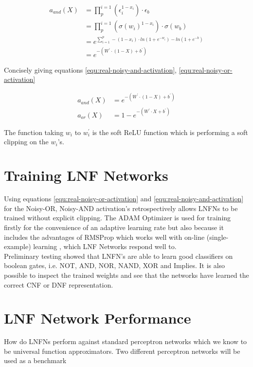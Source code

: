 \begin{align*}
a_{and}(X) &= \prod_{p}^{i=1} (\epsilon_i^{1 - x_i}) \cdot \epsilon_b\\
&= \prod_{p}^{i=1} (\sigma(w_i)^{1 - x_i}) \cdot \sigma(w_b)\\
&= e^{\sum^p_{i=1} -(1 - x_i) \cdot ln(1 + e^{-w_i}) - ln(1 + e^{-b})} \\
&= e^{-(W^{'} \cdot (1 - X) + b^{'})}
\end{align*}

Concisely giving equations \ref{equ:real-noisy-and-activation}, \ref{equ:real-noisy-or-activation}

\begin{align}
a_{and}(X) &= e^{-(W^{'} \cdot (1 - X) + b^{'})} \label{equ:real-noisy-and-activation}\\
a_{or}(X)&= 1 - e^{-(W^{'} \cdot X + b^{'})} \label{equ:real-noisy-or-activation}
\end{align}

The function taking $w_i$ to $w_i^{'}$ is the soft ReLU function which is performing a soft clipping on the $w_i$'s. 

\section{Training LNF Networks}
Using equations \ref{equ:real-noisy-or-activation} and \ref{equ:real-noisy-and-activation} for the Noisy-OR, Noisy-AND activation's retrospectively allows LNFNs to be trained without explicit clipping. The ADAM Optimizer is used for training firstly for the convenience of an adaptive learning rate but also because it includes the advantages of RMSProp which works well with on-line (single-example) learning \cite{kingma2014adam}, which LNF Networks respond well to.\\

Preliminary testing showed that LNFN's are able to learn good classifiers on boolean gates, i.e. NOT, AND, NOR, NAND, XOR and Implies. It is also possible to inspect the trained weights and see that the networks have learned the correct CNF or DNF representation.

\section{LNF Network Performance}
How do LNFNs perform against standard perceptron networks which we know to be universal function approximators. Two different perceptron networks will be used as a benchmark

